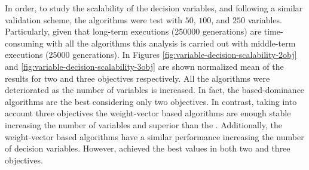 In order, to study the scalability of the decision variables, and following a similar validation scheme, the algorithms were test with $50$, $100$, and $250$ variables.
%
Particularly, given that long-term executions (250000 generations) are time-consuming with all the algorithms this analysis is carried out with middle-term executions (25000 generations).
%
In Figures \ref{fig:variable-decision-scalability-2obj} and \ref{fig:variable-decision-scalability-3obj} are shown normalized mean of the \HV{} results for two and three objectives respectively.
%
All the algorithms were deteriorated as the number of variables is increased.
%
In fact, the based-dominance algorithms are the best considering only two objectives.
%
In contrast, taking into account three objectives the weight-vector based algorithms are enough stable increasing the number of variables and superior than the \NSGAII{}.
%
Additionally, the weight-vector based algorithms have a similar performance increasing the number of decision variables.
%
However, \VSDMOEA{} achieved the best \HV{} values in both two and three objectives.



